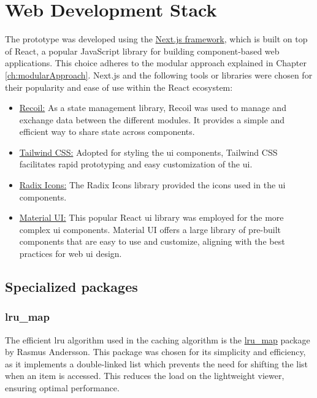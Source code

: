 \section{Web Development Stack}
The prototype was developed using the \href{https://nextjs.org/}{Next.js framework}, which is built on top of React, a popular JavaScript library for building component-based web applications. This choice adheres to the modular approach explained in Chapter \ref{ch:modularApproach}. Next.js and the following tools or libraries were chosen for their popularity and ease of use within the React ecosystem:

\begin{itemize}
    \item \href{https://recoiljs.org/}{Recoil:} As a state management library, Recoil was used to manage and exchange data between the different modules. It provides a simple and efficient way to share state across components.

    \item \href{https://tailwindcss.com/}{Tailwind CSS:} Adopted for styling the \ac{ui} components, Tailwind CSS facilitates rapid prototyping and easy customization of the \ac{ui}.

    \item \href{https://icons.radix-ui.com/}{Radix Icons:} The Radix Icons library provided the icons used in the \ac{ui} components.

    \item \href{https://mui.com/}{Material UI:} This popular React \ac{ui} library was employed for the more complex \ac{ui} components. Material UI offers a large library of pre-built components that are easy to use and customize, aligning with the best practices for web \ac{ui} design.
\end{itemize}

\subsection{Specialized packages}
\subsubsection{lru\_map}
The efficient \ac{lru} algorithm used in the caching algorithm is the \href{https://github.com/rsms/js-lru}{lru\_map} package by Rasmus Andersson. This package was chosen for its simplicity and efficiency, as it implements a double-linked list which prevents the need for shifting the list when an item is accessed. This reduces the load on the lightweight viewer, ensuring optimal performance.

